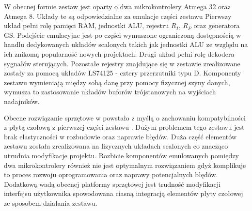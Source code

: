 \documentclass[../main.tex]{subfiles}
\begin{document}
    W obecnej formie zestaw jest oparty o dwa mikrokontrolery Atmega 32 oraz Atmega 8. Układy te są odpowiedzialne za emulacje części zestawu
    Pierwszy układ pełni rolę pamięci RAM, jednostki ALU, rejestru $R_I$, $R_P$ oraz generatora GS. Podejście emulacyjne jest po części wymuszone 
    ograniczoną dostępnością w handlu dedykowanych układów scalonych takich jak jednostki ALU ze względu na ich znikomą popularność nowych projektach. 
    Drugi układ pełni rolę dekodera sygnałów sterujących. Pozostałe rejestry znajdujące się w zestawie zrealizowane zostały za pomocą układów 
    LS74125 - cztery przerzutniki typu D. Komponenty zestawu wymieniają między sobą danę przy pomocy fizycznej szyny danych, wymusza to zastosowanie 
    układów buforów trójstanowych na wyjściach nadajników.
    \par
    Obecne rozwiązanie sprzętowe w powstało z myślą o zachowaniu kompatybilności z płytą czołową z pierwszej części zestawu \cite{szyna:praca}.
    Dużym problemem tego zestawu jest brak elastyczności w rozbudowie oraz naprawie błędów. Duża część elementów zestawu została 
    zrealizowana na fizycznych układach scalonych co znacząco utrudnia modyfikacje projektu. Rozbicie komponentów emulowanych
    pomiędzy dwa mikrokontrolery również nie jest optymalnym rozwiązaniem gdyż komplikuje to proces rozwoju oprogramowania oraz
    naprawy potencjalnych błędów. Dodatkową wadą obecnej platformy sprzętowej jest trudność modyfikacji interfejsu użytkownika spowodowana
    ciasną integracją elementów płyty czołowej ze sposobem działania zestawu.
    
\end{document}
